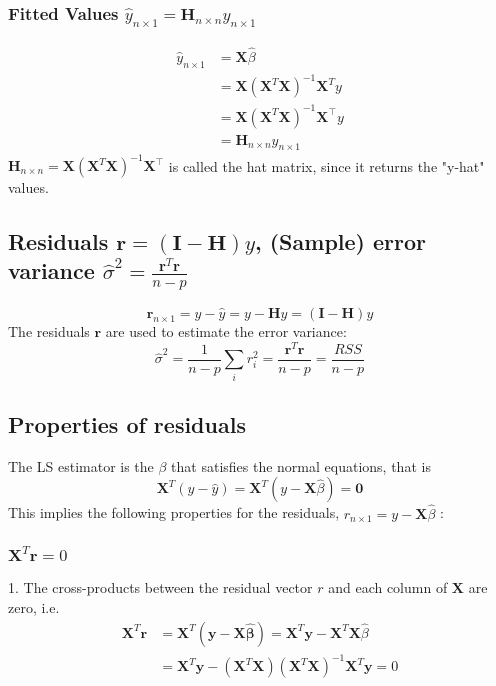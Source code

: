 \documentclass[11pt,a4paper]{article}
\begin{document}
\subsubsection{Fitted Values $\hat{y}_{n \times 1}=\mathbf{H}_{n \times n} y_{n \times 1}$}
$$
\begin{aligned}
\hat{y}_{n \times 1} &=\mathbf{X} \hat{\beta} \\
&=\mathbf{X}\left(\mathbf{X}^{T} \mathbf{X}\right)^{-1} \mathbf{X}^{T} y \\
&=\mathbf{X}\left(\mathbf{X}^{T} \mathbf{X}\right)^{-1} \mathbf{X}^{\top} y\\&=\mathbf{H}_{n \times n} y_{n \times 1}
\end{aligned}
$$
$\mathbf{H}_{n \times n}=\mathbf{X}\left(\mathbf{X}^{T} \mathbf{X}\right)^{-1} \mathbf{X}^{\top}$ is called the hat matrix, since it returns the "y-hat" values.
\subsection{Residuals $\mathbf{r}=(\mathbf{I}-\mathbf{H}) y$, (Sample) error variance $\hat{\sigma}^2=\frac{\mathbf{r}^T \mathbf{r}}{n-p}$}
$$
\mathbf{r}_{n \times 1}=y-\hat{y}=y-\mathbf{H} y=(\mathbf{I}-\mathbf{H}) y
$$
The residuals $\mathbf{r}$ are used to estimate the error variance:
$$
\hat{\sigma}^2=\frac{1}{n-p} \sum_{i} r_{i}^{2}=\frac{\mathbf{r}^T \mathbf{r}}{n-p}=\frac{R S S}{n-p}
$$

\subsection{Properties of residuals}
The LS estimator is the $\beta$ that satisfies the normal equations, that is
$$
\mathbf{X}^{T}(y-\hat{y})=\mathbf{X}^{T}(y-\mathbf{X} \hat{\beta})=\mathbf{0}
$$
This implies the following properties for the residuals, $r_{n \times 1}=y-\mathbf{X} \hat{\beta}$ :
\subsubsection{$\mathbf{X}^{T} \boldsymbol{r}=0$}
1. The cross-products between the residual vector $r$ and each column of $\mathbf{X}$ are zero, i.e.
$$
\begin{aligned}
\mathbf{X}^{T} \boldsymbol{r} &=\mathbf{X}^{T}(\boldsymbol{y}-\mathbf{X} \hat{\boldsymbol{\beta}})=\mathbf{X}^{T} \boldsymbol{y}-\mathbf{X}^{T} \mathbf{X} \hat{\beta} \\
&=\mathbf{X}^{T} \boldsymbol{y}-\left(\mathbf{X}^{T} \mathbf{X}\right)\left(\mathbf{X}^{T} \mathbf{X}\right)^{-1} \mathbf{X}^{T} \boldsymbol{y}=0
\end{aligned}
$$
\end{document}
